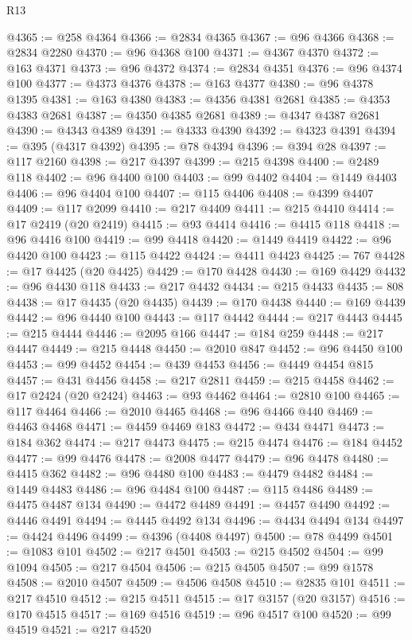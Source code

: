 \begin{lexlean}{R13}
\begin{coremodule}
@4365 := @258 @4364
@4366 := @2834 @4365
@4367 := @96 @4366
@4368 := @2834 @2280
@4370 := @96 @4368 @100
@4371 := @4367 @4370
@4372 := @163 @4371
@4373 := @96 @4372
@4374 := @2834 @4351
@4376 := @96 @4374 @100
@4377 := @4373 @4376
@4378 := @163 @4377
@4380 := @96 @4378 @1395
@4381 := @163 @4380
@4383 := @4356 @4381 @2681
@4385 := @4353 @4383 @2681
@4387 := @4350 @4385 @2681
@4389 := @4347 @4387 @2681
@4390 := @4343 @4389
@4391 := @4333 @4390
@4392 := @4323 @4391
@4394 := @395 (@4317 @4392)
@4395 := @78 @4394
@4396 := @394 @28
@4397 := @117 @2160
@4398 := @217 @4397
@4399 := @215 @4398
@4400 := @2489 @118
@4402 := @96 @4400 @100
@4403 := @99 @4402
@4404 := @1449 @4403
@4406 := @96 @4404 @100
@4407 := @115 @4406
@4408 := @4399 @4407
@4409 := @117 @2099
@4410 := @217 @4409
@4411 := @215 @4410
@4414 := @17 @2419 (@20 @2419)
@4415 := @93 @4414
@4416 := @4415 @118
@4418 := @96 @4416 @100
@4419 := @99 @4418
@4420 := @1449 @4419
@4422 := @96 @4420 @100
@4423 := @115 @4422
@4424 := @4411 @4423
@4425 := 767
@4428 := @17 @4425 (@20 @4425)
@4429 := @170 @4428
@4430 := @169 @4429
@4432 := @96 @4430 @118
@4433 := @217 @4432
@4434 := @215 @4433
@4435 := 808
@4438 := @17 @4435 (@20 @4435)
@4439 := @170 @4438
@4440 := @169 @4439
@4442 := @96 @4440 @100
@4443 := @117 @4442
@4444 := @217 @4443
@4445 := @215 @4444
@4446 := @2095 @166
@4447 := @184 @259
@4448 := @217 @4447
@4449 := @215 @4448
@4450 := @2010 @847
@4452 := @96 @4450 @100
@4453 := @99 @4452
@4454 := @439 @4453
@4456 := @4449 @4454 @815
@4457 := @431 @4456
@4458 := @217 @2811
@4459 := @215 @4458
@4462 := @17 @2424 (@20 @2424)
@4463 := @93 @4462
@4464 := @2810 @100
@4465 := @117 @4464
@4466 := @2010 @4465
@4468 := @96 @4466 @440
@4469 := @4463 @4468
@4471 := @4459 @4469 @183
@4472 := @434 @4471
@4473 := @184 @362
@4474 := @217 @4473
@4475 := @215 @4474
@4476 := @184 @4452
@4477 := @99 @4476
@4478 := @2008 @4477
@4479 := @96 @4478
@4480 := @4415 @362
@4482 := @96 @4480 @100
@4483 := @4479 @4482
@4484 := @1449 @4483
@4486 := @96 @4484 @100
@4487 := @115 @4486
@4489 := @4475 @4487 @134
@4490 := @4472 @4489
@4491 := @4457 @4490
@4492 := @4446 @4491
@4494 := @4445 @4492 @134
@4496 := @4434 @4494 @134
@4497 := @4424 @4496
@4499 := @4396 (@4408 @4497)
@4500 := @78 @4499
@4501 := @1083 @101
@4502 := @217 @4501
@4503 := @215 @4502
@4504 := @99 @1094
@4505 := @217 @4504
@4506 := @215 @4505
@4507 := @99 @1578
@4508 := @2010 @4507
@4509 := @4506 @4508
@4510 := @2835 @101
@4511 := @217 @4510
@4512 := @215 @4511
@4515 := @17 @3157 (@20 @3157)
@4516 := @170 @4515
@4517 := @169 @4516
@4519 := @96 @4517 @100
@4520 := @99 @4519
@4521 := @217 @4520

\end{coremodule}
\end{lexlean}
